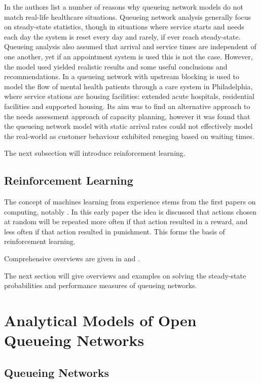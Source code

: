 \documentclass{article}
\begin{document}
In \cite{albinetal90} the authors list a number of reasons why queueing network models do not match real-life healthcare situations.
Queueing network analysis generally focus on steady-state statistics, though in situations where service starts and needs each day the system is reset every day and rarely, if ever reach steady-state.
Queueing analysis also assumed that arrival and service times are independent of one another, yet if an appointment system is used this is not the case.
However, the model used yielded realistic results and some useful conclusions and recommendations.
In \cite{koizumietal05} a queueing network with upstream blocking is used to model the flow of mental health patients through a care system in Philadelphia, where service stations are housing facilities: extended acute hospitals, residential facilities and supported housing.
Its aim was to find an alternative approach to the needs assessment approach of capacity planning, however it was found that the queueing network model with static arrival rates could not effectively model the real-world as customer behaviour exhibited reneging based on waiting times.

The next subsection will introduce reinforcement learning.

\subsection{Reinforcement Learning}

The concept of machines learning from experience stems from the first papers on computing, notably \cite{turing50}.
In this early paper the idea is discussed that actions chosen at random will be repeated more often if that action resulted in a reward, and less often if that action resulted in punishment.
This forms the basis of reinforcement learning.

Comprehensive overviews are given in \cite{suttonbarto98} and \cite{szepesvari10}.

The next section will give overviews and examples on solving the steady-state probabilities and performance measures of queueing networks.

\section{Analytical Models of Open Queueing Networks}\label{sec:analyticalmodels}


\subsection{Queueing Networks}
\end{document}
